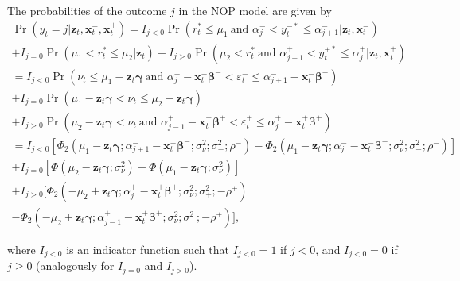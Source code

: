 \documentclass[letterpaper,fleqn,12pt]{article}
\begin{document}
\bigskip

The probabilities of the outcome $j$ in the NOP model are given by%
\begin{equation}
\begin{array}{l}
\Pr (y_{t}=j|\mathbf{z}_{t},\mathbf{x}_{t}^{-},\mathbf{x}_{t}^{+})=I_{j<0}%
\Pr (r_{t}^{\ast }\leq \mu _{1}\ \text{and }\alpha _{j}^{-}<y_{t}^{-\ast
}\leq \alpha _{j+1}^{-}|\mathbf{z}_{t},\mathbf{x}_{t}^{-}) \\ 
+I_{j=0}\Pr (\mu _{1}<r_{t}^{\ast }\leq \mu _{2}|\mathbf{z}_{t})+I_{j>0}\Pr
(\mu _{2}<r_{t}^{\ast }\ \text{and }\alpha _{j-1}^{+}<y_{t}^{+\ast }\leq
\alpha _{j}^{+}|\mathbf{z}_{t},\mathbf{x}_{t}^{+}) \\ 
=I_{j<0}\Pr (\nu _{t}\leq \mu _{1}-\mathbf{z}_{t}\mathbf{\gamma }\ \text{and 
}\alpha _{j}^{-}-\mathbf{x}_{t}^{-}\mathbf{\beta }^{-}<\varepsilon
_{t}^{-}\leq \alpha _{j+1}^{-}-\mathbf{x}_{t}^{-}\mathbf{\beta }^{-}) \\ 
+I_{j=0}\Pr (\mu _{1}-\mathbf{z}_{t}\mathbf{\gamma }<\nu _{t}\leq \mu _{2}-%
\mathbf{z}_{t}\mathbf{\gamma }) \\ 
+I_{j>0}\Pr (\mu _{2}-\mathbf{z}_{t}\mathbf{\gamma }<\nu _{t}\ \text{and }%
\alpha _{j-1}^{+}-\mathbf{x}_{t}^{+}\mathbf{\beta }^{+}<\varepsilon
_{t}^{+}\leq \alpha _{j}^{+}-\mathbf{x}_{t}^{+}\mathbf{\beta }^{+}) \\ 
=I_{j<0}[\Phi _{2}(\mu _{1}-\mathbf{z}_{t}\mathbf{\gamma };\alpha _{j+1}^{-}-%
\mathbf{x}_{t}^{-}\mathbf{\beta }^{-}\mathbf{;}\sigma _{\nu }^{2};\sigma
_{-}^{2};\rho ^{-})-\Phi _{2}(\mu _{1}-\mathbf{z}_{t}\mathbf{\gamma };\alpha
_{j}^{-}-\mathbf{x}_{t}^{-}\mathbf{\beta }^{-}\mathbf{;}\sigma _{\nu
}^{2};\sigma _{-}^{2};\rho ^{-})] \\ 
+I_{j=0}[\Phi (\mu _{2}-\mathbf{z}_{t}\mathbf{\gamma ;}\sigma _{\nu
}^{2})-\Phi (\mu _{1}-\mathbf{z}_{t}\mathbf{\gamma ;}\sigma _{\nu }^{2})] \\ 
+I_{j>0}[\Phi _{2}(-\mu _{2}+\mathbf{z}_{t}\mathbf{\gamma };\alpha _{j}^{+}-%
\mathbf{x}_{t}^{+}\mathbf{\beta }^{+};\sigma _{\nu }^{2};\sigma _{+}^{2};%
\mathbf{-}\rho ^{+}) \\ 
-\Phi _{2}(-\mu _{2}+\mathbf{z}_{t}\mathbf{\gamma };\alpha _{j-1}^{+}-%
\mathbf{x}_{t}^{+}\mathbf{\beta }^{+};\sigma _{\nu }^{2};\sigma _{+}^{2};%
\mathbf{-}\rho ^{+})]\text{,}%
\end{array}
\label{Prob NOP}
\end{equation}

\noindent where $I_{j<0}$ is an indicator function such that $I_{j<0}=1$ if $%
j<0$, and $I_{j<0}=0$ if $j\geq 0$ (analogously for $I_{j=0}$ and $I_{j>0}$).
\end{document}
